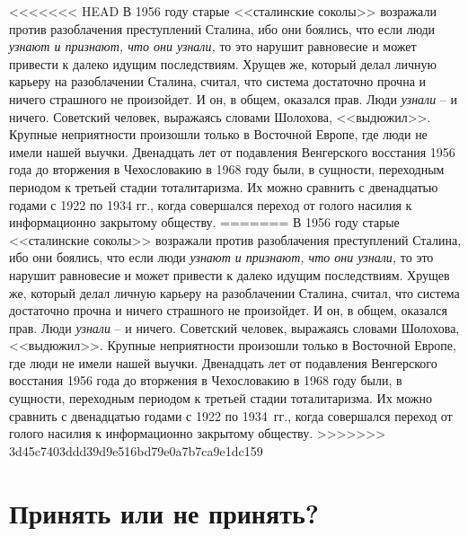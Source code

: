 \documentclass{book}
\begin{document}
<<<<<<< HEAD
В 1956 году старые <<сталинские соколы>> возражали про­тив разоблачения преступлений Сталина, ибо они боялись, что если люди \textit{узнают и признают, что они узнали,}  то это нарушит равновесие и может привести к далеко идущим последствиям. Хрущев же, который делал личную карьеру на разоблачении Сталина, считал, что система достаточно прочна и ничего страшного не произойдет. И он, в общем, оказался прав. Люди \textit{узнали} -- и  ничего. Советский человек, выражаясь словами Шолохова, <<выдюжил>>. Крупные неприятности произошли только в Восточной Европе, где люди не имели нашей выучки. Двенадцать лет от подавления Венгерского восстания 1956 года до вторжения в Чехословакию в 1968 году были, в сущности, переходным периодом к третьей стадии тоталитаризма. Их можно сравнить с двенадцатью годами с 1922 по 1934 гг., ко­гда совершался переход от голого насилия к информационно закрытому обществу.
=======
В 1956 году старые <<сталинские соколы>> возражали про­тив разоблачения преступлений Сталина, ибо они боялись, что если люди \textit{узнают и признают, что они узнали,}  то это нарушит равновесие и может привести к далеко идущим последствиям. Хрущев же, который делал личную карьеру на разоблачении Сталина, считал, что система достаточно прочна и ничего страшного не произойдет. И он, в общем, оказался прав. Люди \textit{узнали} -- и  ничего. Советский человек, выражаясь словами Шолохова, <<выдюжил>>. Крупные неприятности произошли только в Восточной Европе, где люди не имели нашей выучки. Двенадцать лет от подавления Венгерского восстания 1956 года до вторжения в Чехословакию в 1968 году были, в сущности, переходным периодом к третьей стадии тоталитаризма. Их можно сравнить с двенадцатью годами с 1922 по 1934~гг., ко­гда совершался переход от голого насилия к информационно закрытому обществу.
>>>>>>> 3d45c7403ddd39d9e516bd79e0a7b7ca9e1dc159



\section{Принять или не принять?}
\end{document}
